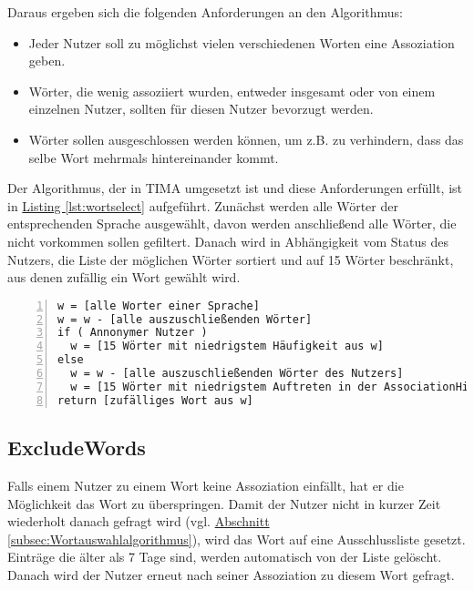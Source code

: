 Daraus ergeben sich die folgenden Anforderungen an den Algorithmus:

\begin{itemize}
	\item Jeder Nutzer soll zu möglichst vielen verschiedenen Worten eine Assoziation geben.
	\item Wörter, die wenig assoziiert wurden, entweder insgesamt oder von einem einzelnen Nutzer, sollten für diesen Nutzer bevorzugt werden.
	\item Wörter sollen ausgeschlossen werden können, um z.B. zu verhindern, dass das selbe Wort mehrmals hintereinander kommt.
\end{itemize}

Der Algorithmus, der in TIMA umgesetzt ist und diese Anforderungen erfüllt, ist in \hyperref[lst:wortselect]{Listing \ref*{lst:wortselect}} aufgeführt. Zunächst werden alle Wörter der entsprechenden Sprache ausgewählt, davon werden anschließend alle Wörter, die nicht vorkommen sollen gefiltert. Danach wird in Abhängigkeit vom Status des Nutzers, die Liste der möglichen Wörter sortiert und auf 15 Wörter beschränkt, aus denen zufällig ein Wort gewählt wird.

\medskip
\begin{lstlisting}[basicstyle=\ttfamily,
backgroundcolor=\color{lightgray},
showspaces=false,
showstringspaces=false,
showtabs=false,
columns=fixed,
frame=lines,
numbers=left,
numbersep=5pt,
breaklines=true,
captionpos=b,
label=lst:wortselect,
caption=Wortauswahlalgorithmus]
w = [alle Worter einer Sprache]
w = w - [alle auszuschließenden Wörter]
if ( Annonymer Nutzer )
  w = [15 Wörter mit niedrigstem Häufigkeit aus w]
else
  w = w - [alle auszuschließenden Wörter des Nutzers]
  w = [15 Wörter mit niedrigstem Auftreten in der AssociationHistory des Buntzers1 aus w]
return [zufälliges Wort aus w]
\end{lstlisting}

\subsection{ExcludeWords}\label{subsec:excludewords}
Falls einem Nutzer zu einem Wort keine Assoziation einfällt, hat er die
Möglichkeit das Wort zu überspringen. Damit der Nutzer nicht in kurzer Zeit
wiederholt danach gefragt wird (vgl.
\hyperref[subsec:Wortauswahlalgorithmus]
{Abschnitt \ref*{subsec:Wortauswahlalgorithmus}}), wird das Wort auf eine
Ausschlussliste gesetzt. Einträge die älter als 7 Tage sind, werden
automatisch von der Liste gelöscht. Danach wird der Nutzer erneut nach
seiner Assoziation zu diesem Wort gefragt.

